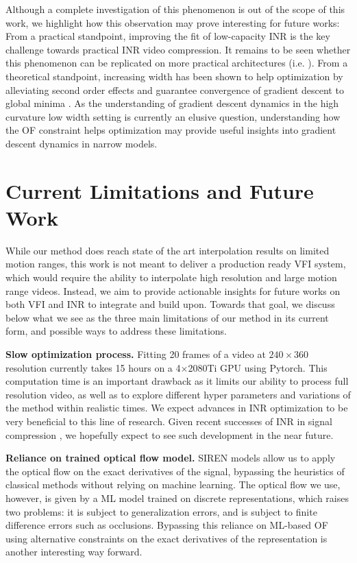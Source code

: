 \documentclass{article}
\begin{document}
Although a complete investigation of this phenomenon is out of the scope of this work,
we highlight how this observation may prove interesting for future works:
From a practical standpoint, improving the fit of low-capacity INR
is the key challenge towards practical INR video compression.
It remains to be seen whether this phenomenon can be replicated on more practical architectures (i.e. \cite{chen2021nerv}).
From a theoretical standpoint, increasing width has been shown to help
optimization by alleviating second order effects \cite{liu2020linearity}
and guarantee convergence of gradient descent to global minima \cite{du2018gradient}.
As the understanding of gradient descent dynamics in the high curvature low width setting
is currently an elusive question, understanding how the OF constraint
helps optimization may provide useful insights into gradient descent dynamics in narrow models.

\section{Current Limitations and Future Work}
\label{sec_lim}

While our method does reach state of the art interpolation results on limited motion ranges,
this work is not meant to deliver a production ready VFI system,
which would require the ability to interpolate high resolution and large motion range videos.
Instead, we aim to provide actionable insights for future works on both VFI and INR to integrate and build upon.
Towards that goal, we discuss below what we see as the three main limitations of our method in its current form,
and possible ways to address these limitations.

\textbf{Slow optimization process.}
Fitting 20 frames of a video at $240 \times 360$ resolution currently takes 15 hours on a 4$\times$2080Ti GPU using Pytorch.
This computation time is an important drawback as it limits our ability to process full resolution video,
as well as to explore different hyper parameters and variations of the method within realistic times.
We expect advances in INR optimization to be very beneficial to this line of research.
Given recent successes of INR in signal compression \cite{zhang2021implicit}\cite{dupont2021coin} \cite{dupont2022coin++} \cite{park2019deepsdf} \cite{mescheder2019occupancy} \cite{chen2021nerv},
we hopefully expect to see such development in the near future.

\textbf{Reliance on trained optical flow model.}
SIREN models allow us to apply the optical flow on the exact derivatives of the signal,
bypassing the heuristics of classical methods without relying on machine learning.
The optical flow we use, however, is given by a ML model trained on discrete representations, which raises two problems:
it is subject to generalization errors,
and is subject to finite difference errors such as occlusions.
Bypassing this reliance on ML-based OF using alternative constraints on the exact derivatives
of the representation is another interesting way forward.
\end{document}
